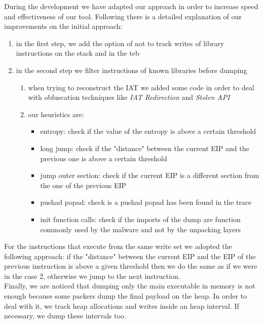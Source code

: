 During the development we have adapted our approach in order to increase speed and effectiveness of our tool. Following there is a detailed explanation of our improvements on the initial approach:
\begin{enumerate}
\item in the first step, we add the option of not to track writes of library instructions on the stack and in the teb
\item in the second step we filter instructions of known libraries before dumping
	\begin{enumerate}
	\item when trying to reconstruct the IAT we added some code in order to deal with 			obfuscation techniques like \textit{IAT Redirection} and \textit{Stolen API}
	\item our heuristics are:
		\begin{itemize}
		\item entropy: check if the value of the entropy is above a certain threshold
		\item long jump: check if the "distance" between the current EIP and the previous 			one is above a certain threshold
		\item jump outer section: check if the current EIP is a different section from the 		one of the previous EIP
		\item pushad popad: check is a pushad popad has been found in the trace
		\item init function calls: check if the imports of the dump are function commonly 			 used by the malware and not by the unpacking layers
		\end{itemize}
	\end{enumerate}
\end{enumerate} 
For the instructions that execute from the same write set we adopted the following approach: if the "distance" between the current EIP and the EIP of the previous instruction is above a given threshold then we do the same as if we were in the case 2, otherwise we jump to the next instruction.\\
Finally, we are noticed that dumping only the main executable in memory is not enough because some packers dump the final payload on the heap. In order to deal with it, we track heap allocations and writes inside an heap interval. If necessary, we dump these intervals too.
